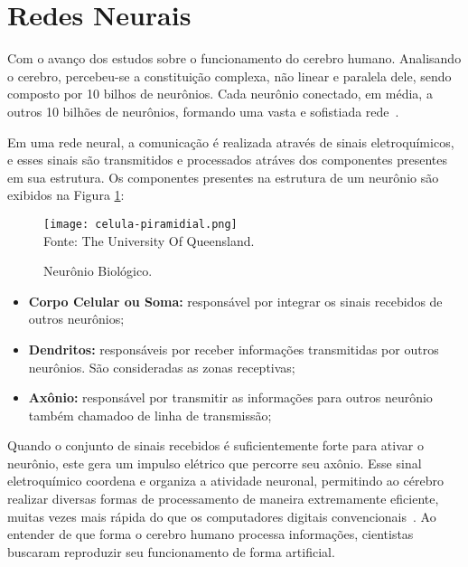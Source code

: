\section{Redes Neurais}
    Com o avanço dos estudos sobre o funcionamento do cerebro humano. Analisando o cerebro, percebeu-se a 
    constituição complexa, não linear e paralela dele, sendo composto por 10 bilhos de neurônios.
    Cada neurônio conectado, em média, a outros 10 bilhões de neurônios, formando uma 
    vasta e sofistiada rede~\cite{haykin2009neural}.

    Em uma rede neural, a comunicação é realizada através de sinais eletroquímicos, e esses sinais são transmitidos 
    e processados atráves dos componentes presentes em sua estrutura. Os componentes presentes na estrutura de um neurônio 
    são exibidos na Figura \ref{fig:neuronio_biologico}:
    \begin{figure}[!htb]
        \centering
        \caption{Neurônio Biológico.}
        \texttt{[image: celula-piramidial.png]}\\
        {\footnotesize Fonte: The University Of Queensland.}\
        \label{fig:neuronio_biologico}
    \end{figure}
    
    \begin{itemize}
        \item \textbf{Corpo Celular ou Soma: }responsável por integrar os sinais recebidos de outros neurônios;
        \item \textbf{Dendritos: }responsáveis por receber informações transmitidas por outros neurônios. 
        São consideradas as zonas receptivas;
        \item \textbf{Axônio: }responsável por transmitir as informações para outros neurônio também chamadoo de linha de 
        transmissão;
    \end{itemize}

    Quando o conjunto de sinais recebidos é suficientemente forte para ativar o neurônio, este gera um impulso elétrico 
    que percorre seu axônio. Esse sinal eletroquímico coordena e organiza a atividade neuronal, permitindo ao cérebro realizar 
    diversas formas de processamento de maneira extremamente eficiente, muitas vezes mais rápida do que os computadores digitais 
    convencionais~\cite{haykin2009neural}. Ao entender de que forma o cerebro humano processa informações, cientistas buscaram 
    reproduzir seu funcionamento de forma artificial.
    

